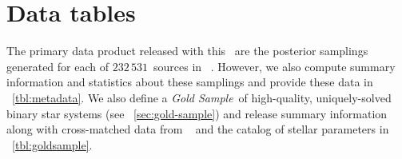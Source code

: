\documentclass[modern]{aastex63}
\newcommand{\nsources}{\ensuremath{232\,531}}
\newcommand{\goldsample}{\textit{Gold Sample}}
\begin{document}
\section{Data tables}
\label{sec:datatables}

The primary data product released with this \documentname\ are the posterior
samplings generated for each of \nsources\ sources in \apogee\ .
However, we also compute summary information and statistics about these
samplings and provide these data in \tablename~\ref{tbl:metadata}.
We also define a \goldsample\ of high-quality, uniquely-solved binary star
systems (see \sectionname~\ref{sec:gold-sample}) and release summary information
along with cross-matched data from \gaia\  and the 
catalog of stellar parameters in \tablename~\ref{tbl:goldsample}.







\end{document}
